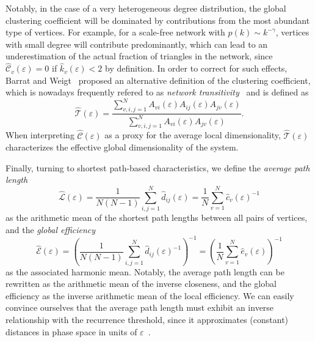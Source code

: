 \documentclass[graybox]{svmult}
\begin{document}
Notably, in the case of a very heterogeneous degree distribution, the global clustering coefficient will be dominated by contributions from the most abundant type of vertices. For example, for a scale-free network with $p(k)\sim k^{-\gamma}$, vertices with small degree will contribute predominantly, which can lead to an underestimation of the actual fraction of triangles in the network, since $\hat{\mathcal{C}}_v(\varepsilon)=0$ if $\hat{k}_v(\varepsilon)<2$ by definition. In order to correct for such effects, Barrat and Weigt~\cite{Barrat2000} proposed an alternative definition of the clustering coefficient, which is nowadays frequently refered to as \textit{network transitivity}~\cite{Boccaletti2006} and is defined as
\begin{equation}
\hat{\mathcal{T}}(\varepsilon)= \frac{\sum_{v,i,j=1}^N A_{vi}(\varepsilon) A_{ij}(\varepsilon) A_{jv}(\varepsilon)}{\sum_{v,i,j=1}^N A_{vi}(\varepsilon) A_{jv}(\varepsilon)}.
\label{eq:transitivity}
\end{equation}
\noindent
When interpreting $\hat{\mathcal{C}}(\varepsilon)$ as a proxy for the average local dimensionality, $\hat{\mathcal{T}}(\varepsilon)$ characterizes the effective global dimensionality of the system.

Finally, turning to shortest path-based characteristics, we define the \textit{average path length}
\begin{equation}
\hat{\mathcal{L}}(\varepsilon)=\frac{1}{N(N-1)} \sum_{i,j=1}^N \hat{d}_{ij}(\varepsilon) = \frac{1}{N} \sum_{v=1}^N \hat{c}_v(\varepsilon)^{-1}
\label{eq:apl}
\end{equation}
\noindent
as the arithmetic mean of the shortest path lengths between all pairs of vertices, and the \textit{global efficiency}
\begin{equation}
\hat{\mathcal{E}}(\varepsilon)=\left(\frac{1}{N(N-1)} \sum_{i,j=1}^N \hat{d}_{ij}(\varepsilon)^{-1} \right)^{-1} = \left( \frac{1}{N} \sum_{v=1}^N \hat{e}_v(\varepsilon) \right)^{-1}
\label{eq:globefficiency}
\end{equation}
\noindent
as the associated harmonic mean. Notably, the average path length can be rewritten as the arithmetic mean of the inverse closeness, and the global efficiency as the inverse arithmetic mean of the local efficiency. We can easily convince ourselves that the average path length must exhibit an inverse relationship with the recurrence threshold, since it approximates (constant) distances in phase space in units of $\varepsilon$~\cite{Donner2010NJP}.
\end{document}
